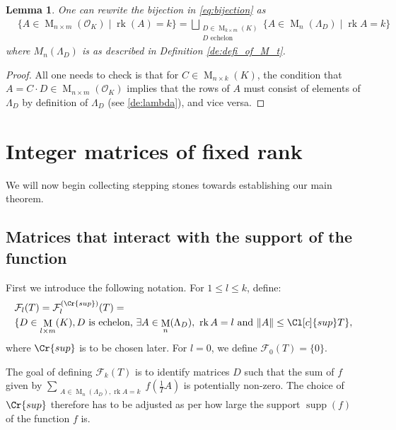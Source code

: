 \documentclass{amsart}
\newtheorem{lemma}[theorem]{Lemma}
\theoremstyle{definition}
\theoremstyle{remark}
\newcommand{\OK}{\mathcal{O}_K}
\newcommand{\KR}{K_\mathbb{R}}
\DeclareMathOperator{\M}{M}
\DeclareMathOperator{\rank}{rk}
\DeclareMathOperator{\supp}{supp}
\begin{document}
\begin{lemma}
    \label{le:new_bijection}
    One can rewrite the bijection in \cref{eq:bijection} as
    \begin{align}
 & \{A \in \M_{n \times m }(\OK) \mid \rank(A) = k \}   
 =   \bigsqcup_{ \substack{ D \in \M_{k \times m}(K) \\ D \text{ echelon }}}
 \{ A \in \M_{n}(\Lambda_{D}) \mid \rank A  = k\}
    \end{align}
    where $M_n(\Lambda_D)$ is as described in Definition \ref{de:defi_of_M_t}. 
\end{lemma}
\begin{proof}
    All one needs to check is that for $C \in \M_{n \times k}(K)$, the condition that $A = C \cdot D \in \M_{n \times m}(\OK)$ implies that the rows of $A$ must consist of elements of $\Lambda_{D}$ by definition of $\Lambda_{D}$ (see \cref{de:lambda}), and vice versa.
\end{proof}



\section{Integer matrices of fixed rank}

We will now begin collecting stepping stones towards establishing our main theorem.

\subsection{Matrices that interact with the support of the function}

First we introduce the following notation. 
For $1 \leq l \leq k$, define:
\begin{align}
  & \mathcal{F}_{l}(T)  = 
  \mathcal{F}_{l}^{(\Cr{sup})}(T) = 
  \\  &  \{D \in \M_{l \times m}(K), D \text{ is echelon, } \exists A \in \M_{n}(\Lambda_D),  \text{ $\rank A = l$ and } \|A\| \leq \Cl[c]{sup}T\},
  \label{eq:defi_of_calF}
\end{align}
where $\Cr{sup}$ is to be chosen later. 
For $l=0$, we define $\mathcal{F}_{0}(T) = \{0\}$.

The goal of defining $\mathcal{F}_{k}(T)$ is to identify matrices $D$ such that the sum  of $f$ given by $    \sum_{\substack{A \in \M_{n}(\Lambda_{D}) , \rank A = k }} f(\tfrac{1}{T} A )    $ is potentially non-zero.
The choice of $\Cr{sup}$ therefore has to be adjusted as per how large the support $\supp(f)$ of the function $f$ is.
\end{document}
